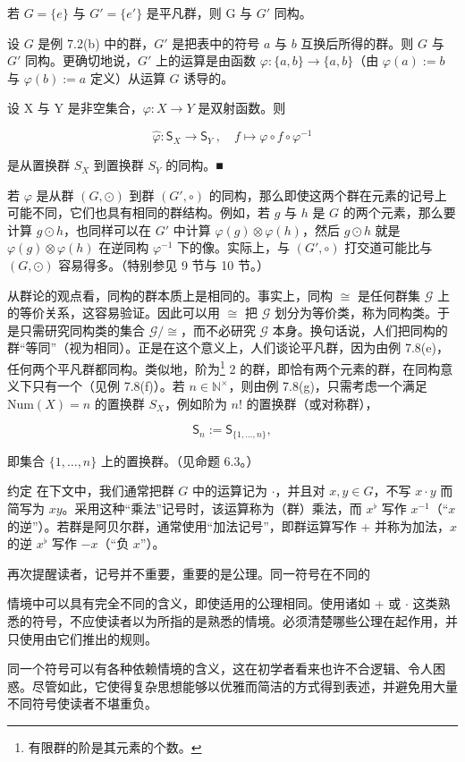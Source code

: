 \begin{example}
\begin{items}
\item

若 $ G = \{e\} $ 与 $ G' = \{e'\} $ 是平凡群，则 G 与 $ G' $ 同构。

\item

设 $G$ 是例 7.2(b) 中的群，$G'$ 是把表中的符号 $a$ 与 $b$ 互换后所得的群。则 $G$ 与 $G'$ 同构。更确切地说，$G'$ 上的运算是由函数 $\varphi: \{a, b\} \to \{a, b\}$（由 $\varphi(a) := b$ 与 $\varphi(b) := a$ 定义）从运算 $G$ 诱导的。

\item

设 X 与 Y 是非空集合，$ \varphi: X \to Y $ 是双射函数。则

\[
\widehat{\varphi}\colon\mathsf{S}_{X}\to\mathsf{S}_{Y}~,\quad f\mapsto\varphi\circ f\circ\varphi^{-1}
\]

是从置换群 $S_X$ 到置换群 $S_Y$ 的同构。■

\end{items}

若 $\varphi$ 是从群 $(G, \odot)$ 到群 $(G', \circ)$ 的同构，那么即使这两个群在元素的记号上可能不同，它们也具有相同的群结构。例如，若 $g$ 与 $h$ 是 $G$ 的两个元素，那么要计算 $g \odot h$，也同样可以在 $G'$ 中计算 $\varphi(g) \otimes \varphi(h)$，然后 $g \odot h$ 就是 $\varphi(g) \otimes \varphi(h)$ 在逆同构 $\varphi^{-1}$ 下的像。实际上，与 $(G', \circ)$ 打交道可能比与 $(G, \odot)$ 容易得多。（特别参见 9 节与 10 节。）

从群论的观点看，同构的群本质上是相同的。事实上，同构 $ \cong $ 是任何群集 $ \mathcal{G} $ 上的等价关系，这容易验证。因此可以用 $ \cong $ 把 $ \mathcal{G} $ 划分为等价类，称为同构类。于是只需研究同构类的集合 $ \mathcal{G}/\cong $，而不必研究 $ \mathcal{G} $ 本身。换句话说，人们把同构的群“等同”（视为相同）。正是在这个意义上，人们谈论平凡群，因为由例 7.8(e)，任何两个平凡群都同构。类似地，阶为\footnote{有限群的阶是其元素的个数。} 2 的群，即恰有两个元素的群，在同构意义下只有一个（见例 7.8(f)）。若 $ n \in \mathbb{N}^\times $，则由例 7.8(g)，只需考虑一个满足 $ \text{Num}(X) = n $ 的置换群 $ S_X $，例如阶为 $ n! $ 的置换群（或对称群），

\[
\mathsf{S}_{n}:=\mathsf{S}_{\{1,\ldots,n\}},
\]

即集合 $ \{1,\ldots,n\} $ 上的置换群。（见命题 6.3。）

约定 在下文中，我们通常把群 $G$ 中的运算记为 $\cdot$，并且对 $x, y \in G$，不写 $x \cdot y$ 而简写为 $xy$。采用这种“乘法”记号时，该运算称为（群）乘法，而 $x^{\flat}$ 写作 $x^{-1}$（“$x$ 的逆”）。若群是阿贝尔群，通常使用“加法记号”，即群运算写作 + 并称为加法，$x$ 的逆 $x^{\flat}$ 写作 $-x$（“负 $x$”）。

再次提醒读者，记号并不重要，重要的是公理。同一符号在不同的

情境中可以具有完全不同的含义，即使适用的公理相同。使用诸如 + 或 $ \cdot $ 这类熟悉的符号，不应使读者以为所指的是熟悉的情境。必须清楚哪些公理在起作用，并只使用由它们推出的规则。

同一个符号可以有各种依赖情境的含义，这在初学者看来也许不合逻辑、令人困惑。尽管如此，它使得复杂思想能够以优雅而简洁的方式得到表述，并避免用大量不同符号使读者不堪重负。

\end{example}

